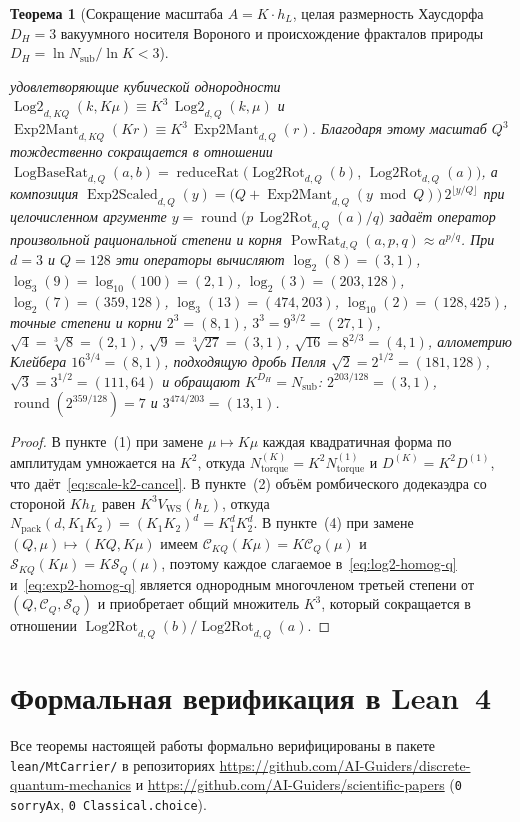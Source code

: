 \documentclass[11pt,a4paper]{article}
\theoremstyle{plain}
\newtheorem{theorem}{Теорема}[section]
\theoremstyle{definition}
\begin{document}
\begin{theorem}[Сокращение масштаба $A = K\cdot h_L$, целая размерность Хаусдорфа $D_H = 3$ вакуумного носителя Вороного и происхождение фракталов природы $D_H = \ln N_{\mathrm{sub}}/\ln K < 3$]
\begin{enumerate}[label=\textbf{(\arabic*)},leftmargin=*]
\begin{equation}
  \end{equation}
  удовлетворяющие кубической однородности $\operatorname{Log2}_{d,KQ}(k,K\mu) \equiv K^3\,\operatorname{Log2}_{d,Q}(k,\mu)$ и $\operatorname{Exp2Mant}_{d,KQ}(K r) \equiv K^3\,\operatorname{Exp2Mant}_{d,Q}(r)$. Благодаря этому масштаб $Q^3$ тождественно сокращается в отношении $\operatorname{LogBaseRat}_{d,Q}(a,b) = \operatorname{reduceRat}\bigl(\operatorname{Log2Rot}_{d,Q}(b),\,\operatorname{Log2Rot}_{d,Q}(a)\bigr)$, а композиция $\operatorname{Exp2Scaled}_{d,Q}(y) = \bigl(Q + \operatorname{Exp2Mant}_{d,Q}(y\bmod Q)\bigr)\,2^{\lfloor y/Q\rfloor}$ при целочисленном аргументе $y = \operatorname{round}\bigl(p\,\operatorname{Log2Rot}_{d,Q}(a)/q\bigr)$ задаёт оператор произвольной рациональной степени и корня $\operatorname{PowRat}_{d,Q}(a,p,q) \approx a^{p/q}$. При $d=3$ и $Q=128$ эти операторы вычисляют $\log_2(8)=(3,1)$, $\log_3(9)=\log_{10}(100)=(2,1)$, $\log_2(3)=(203,128)$, $\log_2(7)=(359,128)$, $\log_3(13)=(474,203)$, $\log_{10}(2)=(128,425)$, точные степени и корни $2^3=(8,1)$, $3^3=9^{3/2}=(27,1)$, $\sqrt{4}=\sqrt[3]{8}=(2,1)$, $\sqrt{9}=\sqrt[3]{27}=(3,1)$, $\sqrt{16}=8^{2/3}=(4,1)$, аллометрию Клейбера $16^{3/4}=(8,1)$, подходящую дробь Пелля $\sqrt{2}=2^{1/2}=(181,128)$, $\sqrt{3}=3^{1/2}=(111,64)$ и обращают $K^{D_H} = N_{\mathrm{sub}}$: $2^{203/128}=(3,1)$, $\operatorname{round}(2^{359/128})=7$ и $3^{474/203}=(13,1)$.
\end{enumerate}
\end{theorem}

\begin{proof}
В пункте~(1) при замене $\mu \mapsto K\mu$ каждая квадратичная форма по амплитудам умножается на $K^2$, откуда $N_{\mathrm{torque}}^{(K)} = K^2 N_{\mathrm{torque}}^{(1)}$ и $D^{(K)} = K^2 D^{(1)}$, что даёт~\eqref{eq:scale-k2-cancel}. В пункте~(2) объём ромбического додекаэдра со стороной $K h_L$ равен $K^3 V_{\mathrm{WS}}(h_L)$, откуда $N_{\mathrm{pack}}(d, K_1 K_2) = (K_1 K_2)^d = K_1^d K_2^d$. В пункте~(4) при замене $(Q, \mu) \mapsto (KQ, K\mu)$ имеем $\mathcal{C}_{KQ}(K\mu) = K\mathcal{C}_Q(\mu)$ и $\mathcal{S}_{KQ}(K\mu) = K\mathcal{S}_Q(\mu)$, поэтому каждое слагаемое в~\eqref{eq:log2-homog-q} и~\eqref{eq:exp2-homog-q} является однородным многочленом третьей степени от $(Q, \mathcal{C}_Q, \mathcal{S}_Q)$ и приобретает общий множитель $K^3$, который сокращается в отношении $\operatorname{Log2Rot}_{d,Q}(b)/\operatorname{Log2Rot}_{d,Q}(a)$.
\end{proof}

\section{Формальная верификация в Lean~4}
Все теоремы настоящей работы формально верифицированы в пакете \texttt{lean/MtCarrier/} в репозиториях \url{https://github.com/AI-Guiders/discrete-quantum-mechanics} и \url{https://github.com/AI-Guiders/scientific-papers} (\texttt{0 sorryAx}, \texttt{0 Classical.choice}).
\end{document}
